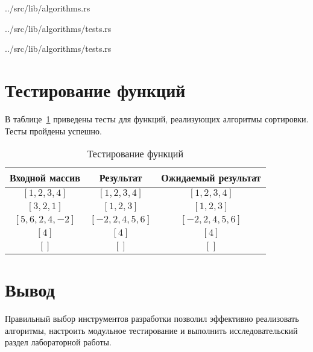 \begin{lstinputlisting}[
	caption={Алгоритм сортировки выбором},
	label={lst:selection},
	style={rust},
	linerange={21-39}
]{../src/lib/algorithms.rs}
\end{lstinputlisting}

\begin{lstinputlisting}[
	caption={Пример реализации теста},
	label={lst:tests},
	style={rust},
	linerange={33-42}
]{../src/lib/algorithms/tests.rs}
\end{lstinputlisting}

\begin{lstinputlisting}[
	caption={Пример реализации бенчмарка},
	label={lst:benches},
	style={rust},
	linerange={57-62}
]{../src/lib/algorithms/tests.rs}
\end{lstinputlisting}

\section{Тестирование функций}

В таблице~\ref{tbl:test} приведены тесты для функций, реализующих алгоритмы сортировки. Тесты пройдены успешно.

\begin{table}[h!]
	\begin{center}
		\begin{tabular}{|c|c|c|}
			\hline
			Входной массив & Результат & Ожидаемый результат \\ 
			\hline
			$[1,2,3,4]$ & $[1,2,3,4]$  & $[1,2,3,4]$\\
			$[3,2,1]$  & $[1,2,3]$ & $[1,2,3]$\\
			$[5,6,2,4,-2]$  & $[-2,2,4,5,6]$  & $[-2,2,4,5,6]$\\
			$[4]$  & $[4]$  & $[4]$\\
			$[]$  & $[]$  & $[]$\\
			\hline
		\end{tabular}
		\caption{\label{tbl:test}Тестирование функций}
	\end{center}
\end{table}

\section*{Вывод}

Правильный выбор инструментов разработки позволил эффективно реализовать алгоритмы, настроить модульное тестирование и выполнить исследовательский раздел лабораторной работы.
